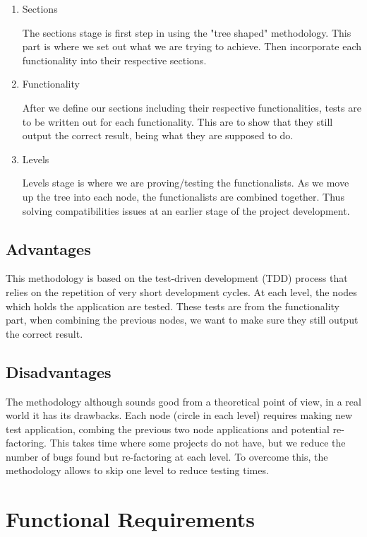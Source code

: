 \begin{enumerate}
  \item Sections
  
    The sections stage is first step in using the "tree shaped" methodology. This part is where we set out what we are trying to achieve. Then incorporate each functionality into their respective sections.
    
  \item Functionality   
    
     After we define our sections including their respective functionalities, tests are to be written out for each functionality. This are to show that they still output the correct result, being what they are supposed to do.
    
  \item Levels
  
    Levels stage is where we are proving/testing the functionalists. As we move up the tree into each node, the functionalists are combined together. Thus solving compatibilities issues at an earlier stage of the project development.
\end{enumerate}

\subsection{Advantages}

This methodology is based on the test-driven development (TDD) process that relies on the repetition of very short development cycles. At each level, the nodes which holds the application are tested. These tests are from the functionality part, when combining the previous nodes, we want to make sure they still output the correct result.

\subsection{Disadvantages}

The methodology although sounds good from a theoretical point of view, in a real world it has its drawbacks. Each node (circle in each level) requires making new test application, combing the previous two node applications and potential re-factoring. This takes time where some projects do not have, but we reduce the number of bugs found but re-factoring at each level. To overcome this, the methodology allows to skip one level to reduce testing times.

\section{Functional Requirements}

